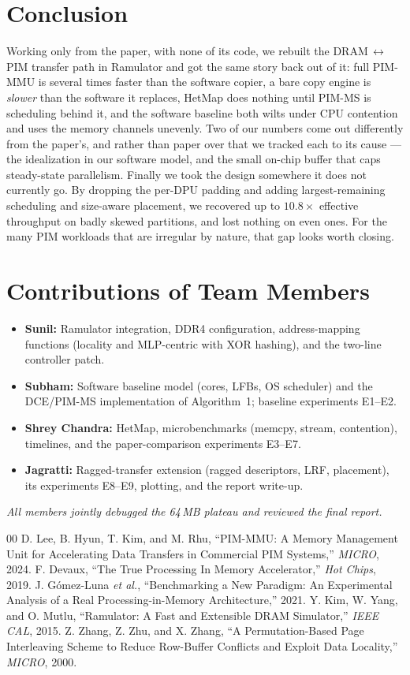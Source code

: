 \documentclass[conference]{IEEEtran}
\begin{document}
\section{Conclusion}
Working only from the paper, with none of its code, we rebuilt the DRAM$\,
\leftrightarrow\,$PIM transfer path in Ramulator and got the same story back out
of it: full PIM-MMU is several times faster than the software copier, a bare copy
engine is \emph{slower} than the software it replaces, HetMap does nothing until
PIM-MS is scheduling behind it, and the software baseline both wilts under CPU
contention and uses the memory channels unevenly. Two of our numbers come out
differently from the paper's, and rather than paper over that we tracked each to
its cause --- the idealization in our software model, and the small on-chip
buffer that caps steady-state parallelism. Finally we took the design somewhere
it does not currently go. By dropping the per-DPU padding and adding
largest-remaining scheduling and size-aware placement, we recovered up to
$10.8\times$ effective throughput on badly skewed partitions, and lost nothing on
even ones. For the many PIM workloads that are irregular by nature, that gap
looks worth closing.

\section*{Contributions of Team Members}
\begin{itemize}
\item \textbf{Sunil:} Ramulator integration, DDR4 configuration, address-mapping
functions (locality and MLP-centric with XOR hashing), and the two-line
controller patch.
\item \textbf{Subham:} Software baseline model (cores, LFBs, OS scheduler) and
the DCE/PIM-MS implementation of Algorithm~1; baseline experiments E1--E2.
\item \textbf{Shrey Chandra:} HetMap, microbenchmarks (memcpy, stream, contention),
timelines, and the paper-comparison experiments E3--E7.
\item \textbf{Jagratti:} Ragged-transfer extension (ragged descriptors, LRF,
placement), its experiments E8--E9, plotting, and the report write-up.
\end{itemize}
\emph{All members jointly debugged the 64\,MB plateau and reviewed the final report.}

\balance
\begin{thebibliography}{00}
 D. Lee, B. Hyun, T. Kim, and M. Rhu, ``PIM-MMU: A Memory
Management Unit for Accelerating Data Transfers in Commercial PIM Systems,''
\emph{MICRO}, 2024.
 F. Devaux, ``The True Processing In Memory Accelerator,''
\emph{Hot Chips}, 2019.
 J. G\'omez-Luna \emph{et al.}, ``Benchmarking a New Paradigm: An
Experimental Analysis of a Real Processing-in-Memory Architecture,'' 2021.
 Y. Kim, W. Yang, and O. Mutlu, ``Ramulator: A Fast and
Extensible DRAM Simulator,'' \emph{IEEE CAL}, 2015.
 Z. Zhang, Z. Zhu, and X. Zhang, ``A Permutation-Based Page
Interleaving Scheme to Reduce Row-Buffer Conflicts and Exploit Data Locality,''
\emph{MICRO}, 2000.
\end{thebibliography}
\end{document}
